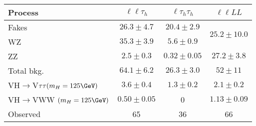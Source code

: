 
    \begin{tabular}{l | c | c | c}
      Process &$\ell \ell \tau_h$& $\ell\tau_h\tau_h$ & $\ell\ell LL$ \\
      \hline
      Fakes & $ 26.3 \pm 4.7 $ & $ 20.4 \pm 2.9 $ & \multirow{2}{*}{$ 25.2 \pm 10.0 $} \\
      WZ & $ 35.3 \pm 3.9 $ & $ 5.6 \pm 0.9 $ & \\
      \hline
      ZZ & $ 2.5 \pm 0.3 $ & $ 0.32 \pm 0.05 $ & $ 27.2 \pm 3.8 $ \\
      \hline
      \hline
      Total bkg. &  $ 64.1 \pm 6.2 $ & $ 26.3 \pm 3.0 $ & $ 52 \pm 11 $ \\
      \hline
      VH$\to$V$\tau\tau (m_H=125\GeV)$ & $ 3.6 \pm 0.4 $ & $ 1.3 \pm 0.2 $ & $ 2.1 \pm 0.2 $ \\
      VH$\to$VWW $(m_H=125\GeV)$ & $ 0.50 \pm 0.05 $ & 0 & $ 1.13 \pm 0.09 $ \\
      \hline
      Observed & 65 & 36 & 66  \\
    \end{tabular}
